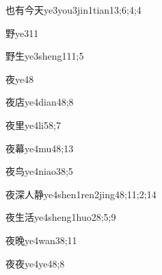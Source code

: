 \begin{verbete}{也有今天}{ye3you3jin1tian1}{3;6;4;4}
\end{verbete}

\begin{verbete}{野}{ye3}{11}
\end{verbete}

\begin{verbete}{野生}{ye3sheng1}{11;5}
\end{verbete}

\begin{verbete}{夜}{ye4}{8}
\end{verbete}

\begin{verbete}{夜店}{ye4dian4}{8;8}
\end{verbete}

\begin{verbete}{夜里}{ye4li5}{8;7}
\end{verbete}

\begin{verbete}{夜幕}{ye4mu4}{8;13}
\end{verbete}

\begin{verbete}{夜鸟}{ye4niao3}{8;5}
\end{verbete}

\begin{verbete}{夜深人静}{ye4shen1ren2jing4}{8;11;2;14}
\end{verbete}

\begin{verbete}{夜生活}{ye4sheng1huo2}{8;5;9}
\end{verbete}

\begin{verbete}{夜晚}{ye4wan3}{8;11}
\end{verbete}

\begin{verbete}{夜夜}{ye4ye4}{8;8}
\end{verbete}

